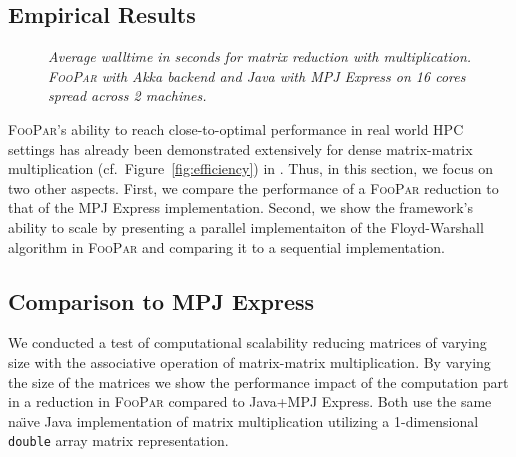 \documentclass{article}
\newcommand{\framework}{{\rmfamily\scshape FooPar}\xspace}
\begin{document}
{\begin{algorithm}
{\section{Empirical Results}
\label{sec:empirical}
 
 \begin{figure}[t]
 \centering
\caption{\it Average walltime in seconds for matrix reduction with multiplication.
\framework with Akka backend and Java with MPJ Express on 16 cores spread across
2 machines.} 
\label{fig:reducetest}
\end{figure}
\framework's ability to reach close-to-optimal performance in real world HPC settings has already been demonstrated extensively for dense matrix-matrix multiplication (cf.\ Figure~\ref{fig:efficiency}) in \cite{ppam13}. Thus, in this section, we focus on two other aspects. First, we compare the performance of a \framework reduction to that of the MPJ Express implementation. Second, we show the framework's ability to scale by presenting 
a parallel implementaiton of the Floyd-Warshall algorithm in \framework and comparing it to a sequential implementation.

\subsection{Comparison to MPJ Express}

We conducted a test of computational scalability reducing  matrices of
varying size with the associative operation of matrix-matrix multiplication. By
varying the size of the matrices we show the performance impact of the
computation part in a reduction in \framework compared to Java+MPJ Express.
Both use the same na\"{\i}ve Java implementation of matrix multiplication utilizing
a 1-dimensional \texttt{double} array matrix representation.



}
\end{algorithm}}
\end{document}
